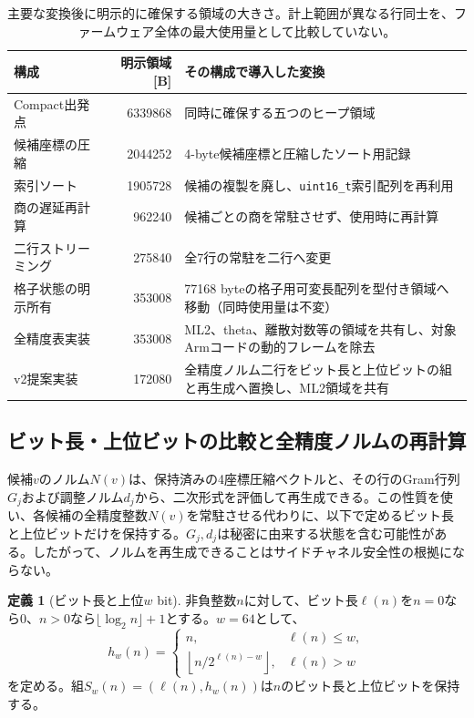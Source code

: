 \documentclass[a4paper,10pt]{ltjsarticle}
\theoremstyle{definition}
\newtheorem{definition}{定義}
\theoremstyle{remark}
\begin{document}
\begin{table}[H]
  \centering
  \caption{主要な変換後に明示的に確保する領域の大きさ。計上範囲が異なる行同士を、ファームウェア全体の最大使用量として比較していない。}
  \label{tab:ablation}
  \scriptsize
  \begin{tabularx}{\linewidth}{@{}l r X@{}}
    \toprule
    構成 & 明示領域 [B] & その構成で導入した変換 \\
    \midrule
    Compact出発点 & \num{6339868} & 同時に確保する五つのヒープ領域 \\
    候補座標の圧縮 & \num{2044252} & 4-byte候補座標と圧縮したソート用記録 \\
    索引ソート & \num{1905728} & 候補の複製を廃し、\texttt{uint16\_t}索引配列を再利用 \\
    商の遅延再計算 & \num{962240} & 候補ごとの商を常駐させず、使用時に再計算 \\
    二行ストリーミング & \num{275840} & 全7行の常駐を二行へ変更 \\
    格子状態の明示所有 & \num{353008} & \num{77168} byteの格子用可変長配列を型付き領域へ移動（同時使用量は不変） \\
    全精度表実装 & \num{353008} & ML2、theta、離散対数等の領域を共有し、対象Armコードの動的フレームを除去 \\
    v2提案実装 & \num{172080} & 全精度ノルム二行をビット長と上位ビットの組と再生成へ置換し、ML2領域を共有 \\
    \bottomrule
  \end{tabularx}
\end{table}

\subsection{ビット長・上位ビットの比較と全精度ノルムの再計算}
\label{sec:sketch}

候補$v$のノルム$N(v)$は、保持済みの4座標圧縮ベクトルと、その行のGram行列$G_j$および調整ノルム$d_j$から、二次形式を評価して再生成できる。この性質を使い、各候補の全精度整数$N(v)$を常駐させる代わりに、以下で定めるビット長と上位ビットだけを保持する。$G_j,d_j$は秘密に由来する状態を含む可能性がある。したがって、ノルムを再生成できることはサイドチャネル安全性の根拠にならない。

\begin{definition}[ビット長と上位$w$ bit]
非負整数$n$に対して、ビット長$\ell(n)$を$n=0$なら0、$n>0$なら$\lfloor\log_2 n\rfloor+1$とする。$w=64$として、
\begin{equation}
  h_w(n)=
  \begin{cases}
    n, & \ell(n)\leq w,\\
    \left\lfloor n/2^{\ell(n)-w}\right\rfloor, & \ell(n)>w
  \end{cases}
\end{equation}
を定める。組$S_w(n)=(\ell(n),h_w(n))$は$n$のビット長と上位ビットを保持する。
\end{definition}
\end{document}
